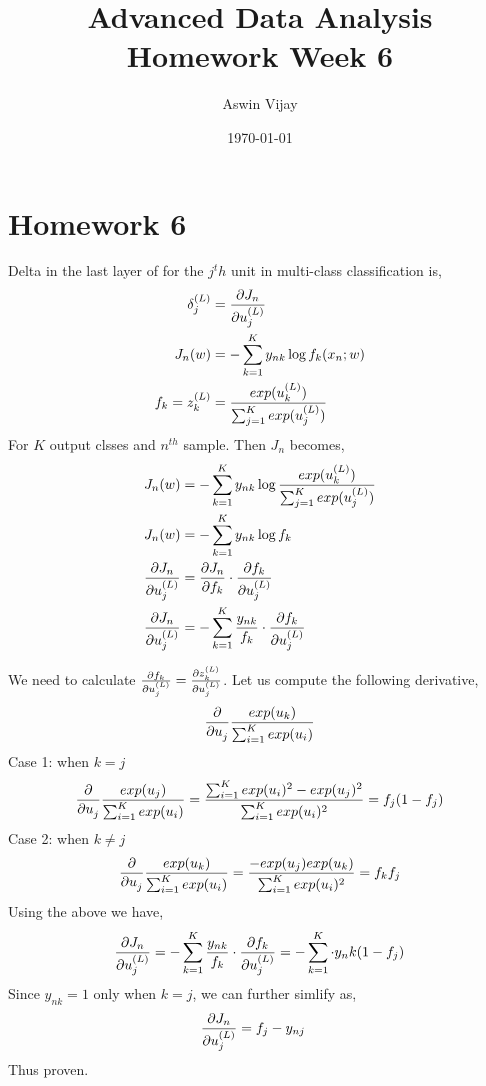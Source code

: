 \documentclass{article}
\title{Advanced Data Analysis\\Homework Week 6}
\author{Aswin Vijay}
\date\today
\begin{document}
\maketitle %

\section*{Homework 6}

Delta in the last layer of for the $j^th$ unit in multi-class classification is,
\begin{align*}
    \delta_j^{(L)} &= \partialderivative{J_n}{u_j^{(L)}}\\
    J_n(w) &= -\sum_{k=1}^{K} y_{nk}\log f_k (x_n;w)\\
    f_k = z_k^{(L)} &= \frac{exp(u_k^{(L)})}{\sum_{j=1}^{K}exp(u_j^{(L)})}
\end{align*}
For $K$ output clsses and $n^{th}$ sample. Then $J_n$ becomes,
\begin{align*}
    J_n(w) &= -\sum_{k=1}^{K} y_{nk}\log \frac{exp(u_k^{(L)})}{\sum_{j=1}^{K}exp(u_j^{(L)})}\\
    J_n(w) &= -\sum_{k=1}^{K} y_{nk}\log f_k\\
    \partialderivative{J_n}{u_j^{(L)}} &= \partialderivative{J_n}{f_k}\cdot \partialderivative{f_k}{u_j^{(L)}} \\
    \partialderivative{J_n}{u_j^{(L)}} &= - \sum_{k=1}^{K}\frac{y_{nk}}{f_k} \cdot \partialderivative{f_k}{u_j^{(L)}} \\
\end{align*}

We need to calculate $\partialderivative{f_k}{u_j^{(L)}} = \partialderivative{z_k^{(L)}}{u_j^{(L)}}$. Let us compute the following derivative,
\begin{align*}
    \partialderivative{}{u_j^{}}\frac{exp(u_k)}{\sum_{i=1}^{K}exp(u_i)}\\
\end{align*}
Case 1: when $k=j$
\begin{align*}
    \partialderivative{}{u_j^{}}\frac{exp(u_j)}{\sum_{i=1}^{K}exp(u_i)} = \frac{\sum_{i=1}^{K}exp(u_i)^2-exp(u_j)^2}{\sum_{i=1}^{K}exp(u_i)^2} = f_j(1-f_j)\\
\end{align*}
Case 2: when $k \ne j$
\begin{align*}
    \partialderivative{}{u_j^{}}\frac{exp(u_k)}{\sum_{i=1}^{K}exp(u_i)} = \frac{-exp(u_j)exp(u_k)}{\sum_{i=1}^{K}exp(u_i)^2} = f_k f_j\\
\end{align*}
Using the above we have,
\begin{align*}
    \partialderivative{J_n}{u_j^{(L)}} &= - \sum_{k=1}^{K}\frac{y_{nk}}{f_k} \cdot \partialderivative{f_k}{u_j^{(L)}} = - \sum_{k=1}^{K} \cdot y_nk (1-f_j)\\
\end{align*}
Since $y_{nk} = 1$ only when $k = j$, we can further simlify as,
\begin{align*}
    \partialderivative{J_n}{u_j^{(L)}} &= f_j - y_{nj}
\end{align*}
Thus proven.
\end{document}
